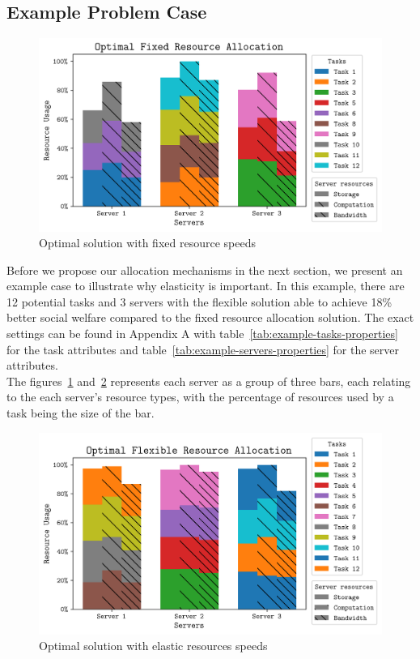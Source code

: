 \subsection{Example Problem Case}
\label{subsec:example-problem-case}
\begin{figure}
    \centering
    \includegraphics[width=\linewidth]{figs/allocation/optimal_fixed_resource_allocation.png}
    \caption{Optimal solution with fixed resource speeds}
    \label{fig:example-fixed-allocation}
\end{figure}
Before we propose our allocation mechanisms in the next section, we present an example case to illustrate
why elasticity is important. In this example, there are 12 potential tasks and 3 servers with the flexible solution
able to achieve 18\% better social welfare compared to the fixed resource allocation solution.
The exact settings can be found in Appendix A with table~\ref{tab:example-tasks-properties}
for the task attributes and table~\ref{tab:example-servers-properties} for the server attributes. \\
The figures~\ref{fig:example-fixed-allocation} and~\ref{fig:example-flexible-allocation} represents each server as a
group of three bars, each relating to the each server's resource types, with the percentage of resources used by a task
being the size of the bar.

\begin{figure}
    \centering
    \includegraphics[width=\linewidth]{figs/allocation/optimal_flexible_resource_allocation.png}
    \caption{Optimal solution with elastic resources speeds}
    \label{fig:example-flexible-allocation}
\end{figure}

